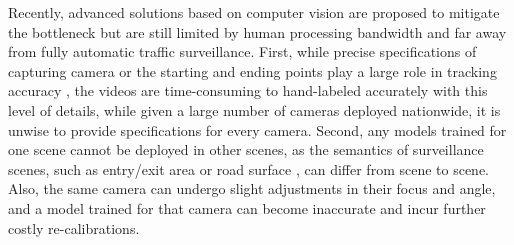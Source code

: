 Recently, advanced solutions based on computer vision
are proposed to mitigate the bottleneck
but are still limited by human processing bandwidth and far away from fully automatic traffic surveillance.
First, while precise specifications of capturing camera or the starting and ending points play a large role in tracking accuracy \cite{yanziVehicleTracker,tamersoy2009robust,rodriguez2010adaptive,mishra2013video,cheng2011intelligent,corral2017slot}, 
the videos are time-consuming to hand-labeled accurately with this level of details,
while given a large number of cameras deployed nationwide, it is unwise to provide specifications for every camera.
%
Second,
any models trained for one scene cannot be deployed in other scenes,
as the semantics of surveillance scenes, such as entry/exit area \cite{tamersoy2009robust,rodriguez2010adaptive} or road surface \cite{bas2007automatic}, can differ from scene to scene. 
Also, the same camera can undergo slight adjustments in their focus and angle, and a model trained for that camera can become inaccurate and incur further costly re-calibrations.



